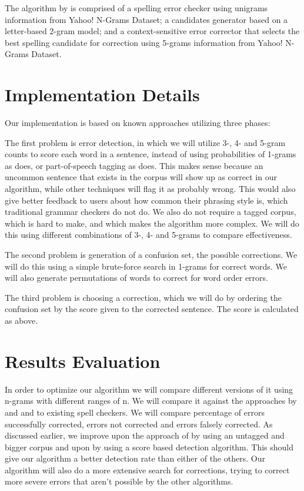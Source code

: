 \documentclass[twocolumn]{article}
\begin{document}
The algorithm by \cite{Bassil12} is comprised of a spelling error checker using unigrams information from Yahoo! N-Grams Dataset; a candidates generator based on a letter-based 2-gram model; and a context-sensitive error corrector that selects the best spelling candidate for correction using 5-grams information from Yahoo! N-Grams Dataset.

\section{Implementation Details}
Our implementation is based on known approaches utilizing three phases:

The first problem is error detection, in which we will utilize 3-, 4- and 5-gram counts to score each word in a sentence, instead of using probabilities of 1-grams as \cite{Bassil12} does, or part-of-speech tagging as \cite{Fossati07} does. This makes sense because an uncommon sentence that exists in the corpus will show up as correct in our algorithm, while other techniques will flag it as probably wrong. This would also give better feedback to users about how common their phrasing style is, which traditional grammar checkers do not do. We also do not require a tagged corpus, which is hard to make, and which makes the algorithm more complex. We will do this using different combinations of 3-, 4- and 5-grams to compare effectiveness.

The second problem is generation of a confusion set, the possible corrections. We will do this using a simple brute-force search in 1-grams for correct words. We will also generate permutations of words to correct for word order errors.

The third problem is choosing a correction, which we will do by ordering the confusion set by the score given to the corrected sentence. The score is calculated as above.

\section{Results Evaluation}
In order to optimize our algorithm we will compare different versions of it using n-grams with different ranges of n. We will compare it against the approaches by \cite{Fossati07} and \cite{Bassil12} and to existing spell checkers. We will compare percentage of errors successfully corrected, errors not corrected and errors falsely corrected. As discussed earlier, we improve upon the approach of \cite{Fossati07} by using an untagged and bigger corpus and upon \cite{Bassil12} by using a score based detection algorithm. This should give our algorithm a better detection rate than either of the others. Our algorithm will also do a more extensive search for corrections, trying to correct more severe errors that aren’t possible by the other algorithms.

\begin{spacing}{0.9}
\small

\end{spacing}
\end{document}
